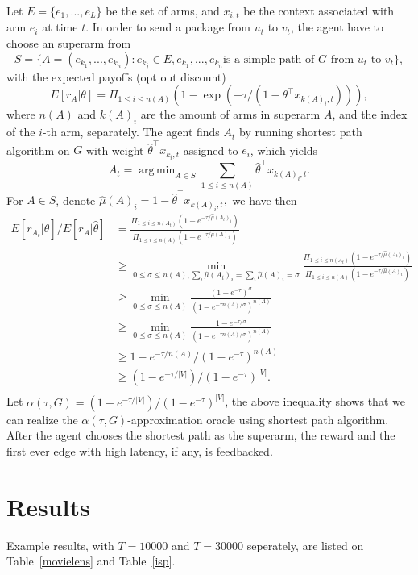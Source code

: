 \documentclass[a4paper,11pt]{article}
\DeclareMathOperator*{\argmin}{arg\,min}
\begin{document}
Let $E=\{e_1,...,e_L\}$ be the set of arms, and $x_{i,t}$ be the context associated with arm $e_i$ at time $t$.
In order to send a package from $u_t$ to $v_t$,
the agent have to choose an superarm from $$S=\{A=(e_{k_1},...,e_{k_n}):e_{k_j}\in E, e_{k_1},...,e_{k_n} \text{is a simple path of } G \text{ from } u_t \text{ to } v_t\},$$
with the expected payoffs (opt out discount) $$E[r_A|\theta]=\Pi_{1\leq i\leq n(A)}(1-\exp(-\tau/(1-\theta^{\top}x_{k(A)_i,t}))),$$
where $n(A)$ and $k(A)_i$ are the amount of arms in superarm $A$, and the index of the $i$-th arm, separately.
The agent finds $A_t$ by running shortest path algorithm on $G$ with weight $\hat{\theta}^{\top}x_{k_i,t}$ assigned to $e_i$, which yields $$A_t=\argmin_{A\in S}\sum_{1\leq i\leq n(A)}\hat{\theta}^{\top}x_{k(A)_i,t}.$$
For $A\in S$, denote $\hat{\mu}(A)_i=1-\hat{\theta}^{\top}x_{k(A)_i,t},$ we have then 
\begin{align*}
  E[r_{A_t}|\hat{\theta}]/E[r_A|\hat{\theta}] &= \frac{\Pi_{1\leq i\leq n(A_t)}(1-e^{-\tau/\hat{\mu}(A_t)_i})}{\Pi_{1\leq i\leq n(A)}(1-e^{-\tau/\hat{\mu}(A)_i})}\\
  &\geq \min_{0\leq \sigma \leq n(A), \sum_i \hat{\mu}(A_t)_i=\sum_i \hat{\mu}(A)_i=\sigma}\frac{\Pi_{1\leq i\leq n(A_t)}(1-e^{-\tau/\hat{\mu}(A_t)_i})}{\Pi_{1\leq i\leq n(A)}(1-e^{-\tau/\hat{\mu}(A)_i})}\\
  &\geq \min_{0\leq \sigma \leq n(A)}\frac{(1-e^{-\tau})^\sigma}{(1-e^{-\tau n(A)/\sigma})^{n(A)}}\\
  &\geq \min_{0\leq \sigma \leq n(A)}\frac{1-e^{-\tau/\sigma}}{(1-e^{-\tau n(A)/\sigma})^{n(A)}}\\
  &\geq 1-e^{-\tau/n(A)}/(1-e^{-\tau})^{n(A)}\\
  &\geq (1-e^{-\tau/|V|})/(1-e^{-\tau})^{|V|}.\\
\end{align*}
Let $\alpha(\tau, G)=(1-e^{-\tau/|V|})/(1-e^{-\tau})^{|V|}$, the above inequality shows that we can realize the $\alpha(\tau, G)$-approximation oracle using shortest path algorithm.
After the agent chooses the shortest path as the superarm, the reward and the first ever edge with high latency, if any, is feedbacked.

\section{Results}

Example results, with $T=10000$ and $T=30000$ seperately, are listed on Table~\ref{movielens} and Table~\ref{isp}.
\end{document}
